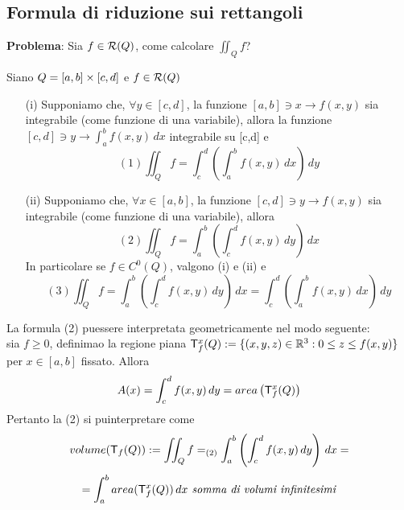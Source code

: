 \subsection{Formula di riduzione sui rettangoli}
\textbf{Problema}: Sia $f \in \mathcal{R}(Q)$, come calcolare $\iint_{Q}f$?
\begin{theorem}
  \label{ridRettangoli}
  Siano $Q = [a,b]\times[c,d]$ e $f \in \mathcal{R}(Q)$
  \begin{itemize}
    \item[(i)] Supponiamo che, $\forall y \in [c,d]$, la funzione 
                $[a,b]\ni x \to f(x,y)$ sia integrabile (come funzione di una variabile), 
                allora la funzione 
                $[c,d]\ni y \to \int_{a}^{b} f(x,y) \, dx$ \ace integrabile su [c,d] e 
                $$(1) \iint_{Q} f = \int_{c}^{d} \left(\int_{a}^{b} f(x,y) \, dx\right) \, dy$$
    \item[(ii)] Supponiamo che, $\forall x \in [a,b]$, la funzione 
                $[c,d]\ni y \to f(x,y)$ sia integrabile (come funzione di una variabile), 
                allora 
                $$(2) \iint_{Q} f = \int_{a}^{b} \left(\int_{c}^{d} f(x,y) \, dy\right) \, dx$$
                In particolare se $f\in C^0(Q)$, valgono (i) e (ii) e 
                $$(3) \iint_{Q} f = \int_{a}^{b} \left(\int_{c}^{d} f(x,y) \, dy\right) \, dx = \int_{c}^{d} \left(\int_{a}^{b} f(x,y) \, dx\right) \, dy$$
  \end{itemize}
\end{theorem}
\begin{osservazione}
  La formula (2) pu\aco essere interpretata geometricamente nel modo seguente: \\
  sia $f \geq 0$, definimao la regione piana $\mathsf{T}_{f}^{x}(Q):=\{(x,y,z)\in \mathbb{R}^3 : 0 \leq z \leq f(x,y)\}$ per 
  $x\in[a,b]$ fissato. Allora $$A(x) = \int_{c}^{d} f(x,y) \, dy = area\left(\mathsf{T}_{f}^{x}(Q)\right)$$
  Pertanto la (2) si pu\aco interpretare come 
  $$volume(\mathsf{T}_{f}(Q)):= \iint_{Q}f =_{(2)} \int_{a}^{b} \left(\int_{c}^{d} f(x,y) \, dy\right) \, dx = $$
  $$= \int_{a}^{b} area(\mathsf{T}_{f}^{x}(Q)) \, dx \textit{ somma di volumi infinitesimi}$$
\end{osservazione}
